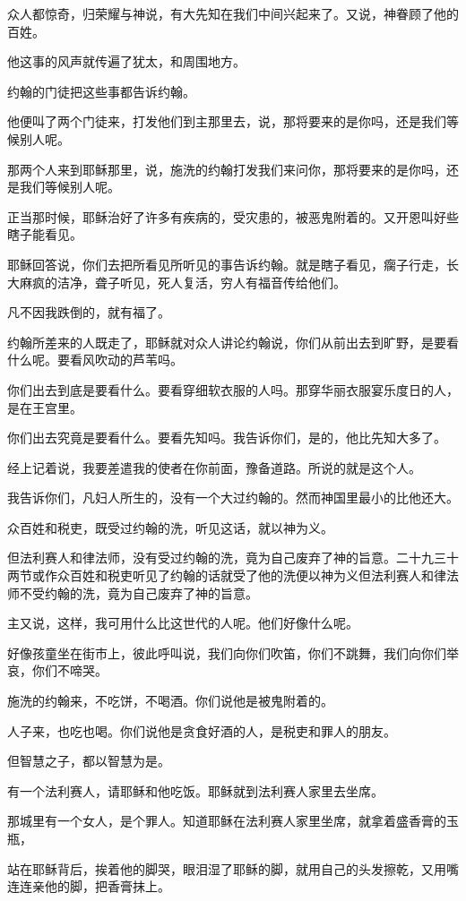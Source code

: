 \documentclass[12pt,oneside]{book}
\begin{document}
众人都惊奇，归荣耀与神说，有大先知在我们中间兴起来了。又说，神眷顾了他的百姓。

他这事的风声就传遍了犹太，和周围地方。

约翰的门徒把这些事都告诉约翰。

他便叫了两个门徒来，打发他们到主那里去，说，那将要来的是你吗，还是我们等候别人呢。

那两个人来到耶稣那里，说，施洗的约翰打发我们来问你，那将要来的是你吗，还是我们等候别人呢。

正当那时候，耶稣治好了许多有疾病的，受灾患的，被恶鬼附着的。又开恩叫好些瞎子能看见。

耶稣回答说，你们去把所看见所听见的事告诉约翰。就是瞎子看见，瘸子行走，长大麻疯的洁净，聋子听见，死人复活，穷人有福音传给他们。

凡不因我跌倒的，就有福了。

约翰所差来的人既走了，耶稣就对众人讲论约翰说，你们从前出去到旷野，是要看什么呢。要看风吹动的芦苇吗。

你们出去到底是要看什么。要看穿细软衣服的人吗。那穿华丽衣服宴乐度日的人，是在王宫里。

你们出去究竟是要看什么。要看先知吗。我告诉你们，是的，他比先知大多了。

经上记着说，我要差遣我的使者在你前面，豫备道路。所说的就是这个人。

我告诉你们，凡妇人所生的，没有一个大过约翰的。然而神国里最小的比他还大。

众百姓和税吏，既受过约翰的洗，听见这话，就以神为义。

但法利赛人和律法师，没有受过约翰的洗，竟为自己废弃了神的旨意。二十九三十两节或作众百姓和税吏听见了约翰的话就受了他的洗便以神为义但法利赛人和律法师不受约翰的洗，竟为自己废弃了神的旨意。

主又说，这样，我可用什么比这世代的人呢。他们好像什么呢。

好像孩童坐在街市上，彼此呼叫说，我们向你们吹笛，你们不跳舞，我们向你们举哀，你们不啼哭。

施洗的约翰来，不吃饼，不喝酒。你们说他是被鬼附着的。

人子来，也吃也喝。你们说他是贪食好酒的人，是税吏和罪人的朋友。

但智慧之子，都以智慧为是。

有一个法利赛人，请耶稣和他吃饭。耶稣就到法利赛人家里去坐席。

那城里有一个女人，是个罪人。知道耶稣在法利赛人家里坐席，就拿着盛香膏的玉瓶，

站在耶稣背后，挨着他的脚哭，眼泪湿了耶稣的脚，就用自己的头发擦乾，又用嘴连连亲他的脚，把香膏抹上。
\end{document}
